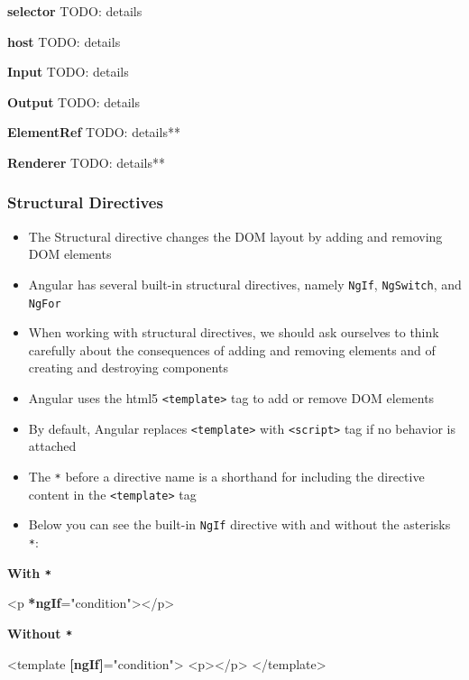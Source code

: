 \documentclass[12pt,]{article}
\newenvironment{Shaded}{}{}
\newcommand{\KeywordTok}[1]{\textcolor[rgb]{0.00,0.00,1.00}{{#1}}}
\newcommand{\StringTok}[1]{\textcolor[rgb]{0.00,0.50,0.50}{{#1}}}
\newcommand{\OtherTok}[1]{\textcolor[rgb]{1.00,0.25,0.00}{{#1}}}
\newcommand{\ErrorTok}[1]{\textcolor[rgb]{1.00,0.00,0.00}{\textbf{{#1}}}}
\providecommand{\tightlist}{%
  \setlength{\itemsep}{0pt}\setlength{\parskip}{0pt}}
\begin{document}
\textbf{selector} TODO: details

\textbf{host} TODO: details

\textbf{Input} TODO: details

\textbf{Output} TODO: details

\textbf{ElementRef} TODO: details**

\textbf{Renderer} TODO: details**

\subsubsection{Structural Directives}\label{structural-directives}

\begin{itemize}
\tightlist
\item
  The Structural directive changes the DOM layout by adding and removing
  DOM elements
\item
  Angular has several built-in structural directives, namely
  \texttt{NgIf}, \texttt{NgSwitch}, and \texttt{NgFor}
\item
  When working with structural directives, we should ask ourselves to
  think carefully about the consequences of adding and removing elements
  and of creating and destroying components
\item
  Angular uses the html5 \texttt{\textless{}template\textgreater{}} tag
  to add or remove DOM elements
\item
  By default, Angular replaces
  \texttt{\textless{}template\textgreater{}} with
  \texttt{\textless{}script\textgreater{}} tag if no behavior is
  attached
\item
  The \texttt{*} before a directive name is a shorthand for including
  the directive content in the
  \texttt{\textless{}template\textgreater{}} tag
\item
  Below you can see the built-in \texttt{NgIf} directive with and
  without the asterisks \texttt{*}:
\end{itemize}

\textbf{With \texttt{*}}

\begin{Shaded}
\begin{Highlighting}[numbers=left,,]
\KeywordTok{<p} \ErrorTok{*ngIf}\OtherTok{=}\StringTok{"condition"}\KeywordTok{></p>}
\end{Highlighting}
\end{Shaded}

\textbf{Without \texttt{*}}

\begin{Shaded}
\begin{Highlighting}[numbers=left,,]
\KeywordTok{<template} \ErrorTok{[ngIf]}\OtherTok{=}\StringTok{"condition"}\KeywordTok{>}
  \KeywordTok{<p></p>}
\KeywordTok{</template>}
\end{Highlighting}
\end{Shaded}
\end{document}
